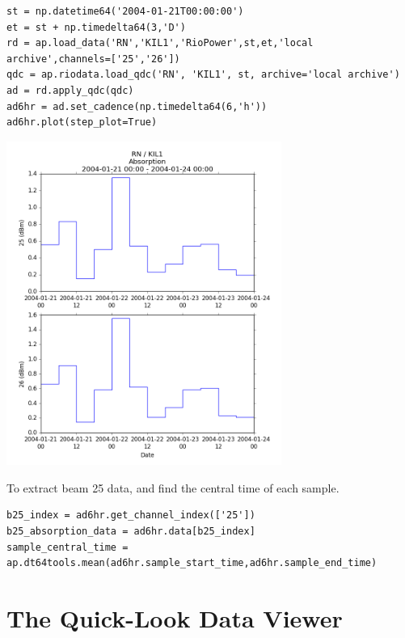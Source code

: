 \documentclass{article}
\begin{document}
\begin{lstlisting}[style=pythonstyle]
st = np.datetime64('2004-01-21T00:00:00')
et = st + np.timedelta64(3,'D')
rd = ap.load_data('RN','KIL1','RioPower',st,et,'local archive',channels=['25','26'])
qdc = ap.riodata.load_qdc('RN', 'KIL1', st, archive='local archive')
ad = rd.apply_qdc(qdc)
ad6hr = ad.set_cadence(np.timedelta64(6,'h'))
ad6hr.plot(step_plot=True)
\end{lstlisting}

\includegraphics[width=9cm]{images/figure_6.png}

To extract beam 25 data, and find the central time of each sample.

\begin{lstlisting}[style=pythonstyle]
b25_index = ad6hr.get_channel_index(['25'])
b25_absorption_data = ad6hr.data[b25_index]
sample_central_time = ap.dt64tools.mean(ad6hr.sample_start_time,ad6hr.sample_end_time) 
\end{lstlisting}


\section{The Quick-Look Data Viewer}
\end{document}
